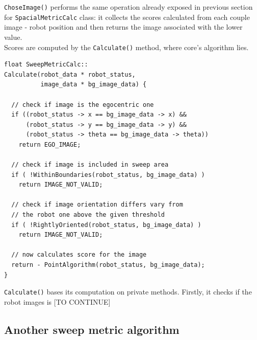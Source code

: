 \texttt{ChoseImage()} performs the same operation already
exposed in previous section for \texttt{SpacialMetricCalc}
class: it collects the scores calculated from each couple image -
robot position and then returns the image associated with
the lower value.
\\
Scores are computed by the \texttt{Calculate()}
method, where core's algorithm lies.
\\
\begin{lstlisting}[caption={\texttt{SweepMetricCalc::Calculate} method},
    label={code:sweepmetriccalc:calculate}]
float SweepMetricCalc::
Calculate(robot_data * robot_status,
          image_data * bg_image_data) {
  
  // check if image is the egocentric one 
  if ((robot_status -> x == bg_image_data -> x) &&
      (robot_status -> y == bg_image_data -> y) &&
      (robot_status -> theta == bg_image_data -> theta))
    return EGO_IMAGE;

  // check if image is included in sweep area
  if ( !WithinBoundaries(robot_status, bg_image_data) )
    return IMAGE_NOT_VALID;
  
  // check if image orientation differs vary from
  // the robot one above the given threshold
  if ( !RightlyOriented(robot_status, bg_image_data) )
    return IMAGE_NOT_VALID;
  
  // now calculates score for the image
  return - PointAlgorithm(robot_status, bg_image_data);
}
\end{lstlisting}

\texttt{Calculate()} bases its computation on private
methods. Firstly, it checks if the robot images is
[TO CONTINUE]

\subsection{Another sweep metric algorithm}
\label{concr:iimageselector:another_sweep_metric_algorithm}

